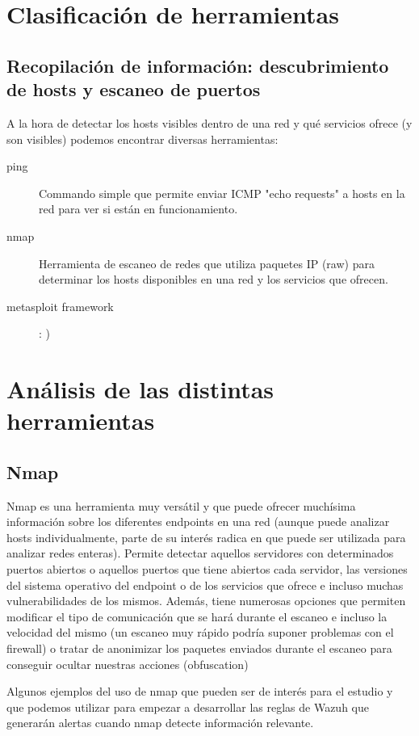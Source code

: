 \section{Clasificación de herramientas}
\subsection{Recopilación de información: descubrimiento de hosts y escaneo de puertos}
A la hora de detectar los hosts visibles dentro de una red y qué servicios ofrece (y son visibles) podemos encontrar diversas herramientas:

\begin{description}
    \item[ping] Commando simple que permite enviar ICMP "echo requests" a hosts en la red para ver si están en funcionamiento.
    \item [nmap] Herramienta de escaneo de redes que utiliza paquetes IP (raw) para determinar los hosts disponibles en una red y los servicios que ofrecen.
    \item [metasploit framework] : ) 
\end{description}
\section{Análisis de las distintas herramientas}

\subsection{Nmap}

Nmap es una herramienta muy versátil y que puede ofrecer muchísima información sobre los diferentes endpoints en una red (aunque puede analizar hosts individualmente, parte de su interés radica en que puede ser utilizada para analizar redes enteras). Permite detectar aquellos servidores con determinados puertos abiertos o aquellos puertos que tiene abiertos cada servidor, las versiones del sistema operativo del endpoint o de los servicios que ofrece e incluso muchas vulnerabilidades de los mismos. Además, tiene numerosas opciones que permiten modificar el tipo de comunicación que se hará durante el escaneo e incluso la velocidad del mismo (un escaneo muy rápido podría suponer problemas con el firewall) o tratar de anonimizar los paquetes enviados durante el escaneo para conseguir ocultar nuestras acciones (\Gls{obfuscation})  

Algunos ejemplos del uso de nmap que pueden ser de interés para el estudio y que podemos utilizar para empezar a desarrollar las reglas de Wazuh que generarán alertas cuando nmap detecte información relevante.

